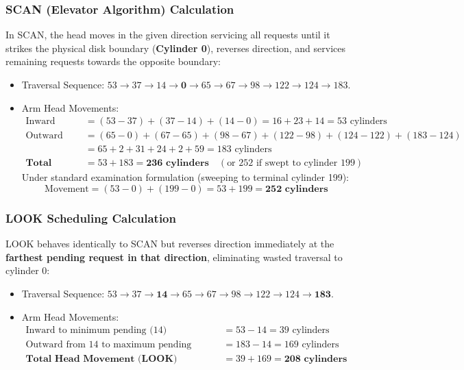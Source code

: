 \subsubsection{SCAN (Elevator Algorithm) Calculation}
In SCAN, the head moves in the given direction servicing all requests until it strikes the physical disk boundary (\textbf{Cylinder 0}), reverses direction, and services remaining requests towards the opposite boundary:
\begin{itemize}
    \item Traversal Sequence: $53 \to 37 \to 14 \to \mathbf{0} \to 65 \to 67 \to 98 \to 122 \to 124 \to 183$.
    \item Arm Head Movements:
    \begin{align*}
    \text{Inward Sweep} &= (53 - 37) + (37 - 14) + (14 - 0) = 16 + 23 + 14 = 53\text{ cylinders} \\
    \text{Outward Sweep} &= (65 - 0) + (67 - 65) + (98 - 67) + (122 - 98) + (124 - 122) + (183 - 124) \\
    &= 65 + 2 + 31 + 24 + 2 + 59 = 183\text{ cylinders} \\
    \mathbf{\text{Total Head Movement (SCAN)}} &= 53 + 183 = \mathbf{236\text{ cylinders}} \quad (\text{or } 252 \text{ if swept to cylinder 199})
    \end{align*}
    Under standard examination formulation (sweeping to terminal cylinder 199):
    \[
    \text{Movement} = (53 - 0) + (199 - 0) = 53 + 199 = \mathbf{252\text{ cylinders}}
    \]
\end{itemize}

\subsubsection{LOOK Scheduling Calculation}
LOOK behaves identically to SCAN but reverses direction immediately at the \textbf{farthest pending request in that direction}, eliminating wasted traversal to cylinder 0:
\begin{itemize}
    \item Traversal Sequence: $53 \to 37 \to \mathbf{14} \to 65 \to 67 \to 98 \to 122 \to 124 \to \mathbf{183}$.
    \item Arm Head Movements:
    \begin{align*}
    \text{Inward to minimum pending (14)} &= 53 - 14 = 39\text{ cylinders} \\
    \text{Outward from 14 to maximum pending (183)} &= 183 - 14 = 169\text{ cylinders} \\
    \mathbf{\text{Total Head Movement (LOOK)}} &= 39 + 169 = \mathbf{208\text{ cylinders}}
    \end{align*}
\end{itemize}

